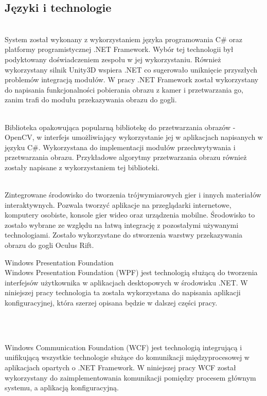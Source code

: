 \documentclass[a4paper,11pt,twoside]{report}
\theoremstyle{definition}
\begin{document}
\subsection{Języki i technologie }
\begin{description}
\item [Język programowania C\# ] \hfill \\
System został wykonany z wykorzystaniem języka programowania C\# oraz platformy programistycznej .NET Framework. Wybór tej technologii był podyktowany doświadczeniem zespołu w jej wykorzystaniu. Również wykorzystany silnik Unity3D wspiera .NET co sugerowało uniknięcie przyszłych problemów integracją modułów. W pracy .NET Framework został wykorzystany do napisania funkcjonalności pobierania obrazu z kamer i przetwarzania go, zanim trafi do modułu przekazywania obrazu do gogli.

\item [EmguCV] \hfill \\
Biblioteka opakowująca popularną bibliotekę do przetwarzania obrazów - OpenCV, w interfejs umożliwiający wykorzystanie jej w aplikacjach napisanych w języku C\#. Wykorzystana do implementacji modułów przechwytywania i przetwarzania obrazu. Przykładowe algorytmy przetwarzania obrazu również zostały napisane z wykorzystaniem tej biblioteki. 

\item [Silnik Unity3D] \hfill \\
Zintegrowane środowisko do tworzenia trójwymiarowych gier i innych materiałów interaktywnych.  Pozwala tworzyć aplikacje na przeglądarki internetowe, komputery osobiste, konsole gier wideo oraz urządzenia mobilne. Środowisko to zostało wybrane ze względu na łatwą integrację z pozostałymi używanymi technologiami. Zostało wykorzystane do stworzenia warstwy przekazywania obrazu do gogli Oculus Rift.

\begin{minipage}{\linewidth}
\item [Windows Presentation Foundation] \hfill \\
Windows Presentation Foundation (WPF) jest technologią służącą do tworzenia interfejsów użytkownika w aplikacjach desktopowych w środowisku .NET. W niniejszej pracy technologia ta została wykorzystana do napisania aplikacji konfiguracyjnej, która szerzej opisana będzie w dalszej części pracy.
\end{minipage}\\

\item [Windows Communication Foundation] \hfill \\
Windows Communication Foundation (WCF) jest technologią integrującą i unifikującą wszystkie technologie służące do komunikacji międzyprocesowej w aplikacjach opartych o .NET Framework. W niniejszej pracy WCF został wykorzystany do zaimplementowania komunikacji pomiędzy procesem głównym systemu, a aplikacją konfiguracyjną.
\end{description}
\end{document}
